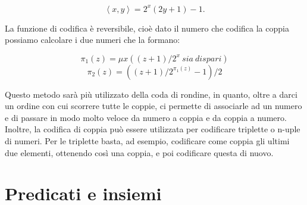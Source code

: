\begin{equation}\left\langle x,y \right\rangle = 2^x(2y+1)-1.\end{equation}

La funzione di codifica \`e reversibile, cio\`e dato il numero che codifica la coppia possiamo calcolare i due numeri che la formano:

\begin{equation}\pi_{1}(z) = \mu x((z+1)/2^x\ sia \ dispari)\end{equation}
\begin{equation}\pi_{2}(z) = ((z+1)/2^{\pi_{1}(z)} -1)/2 \end{equation} 

Questo metodo sar\`a pi\`u utilizzato della coda di rondine, in quanto, oltre a darci un ordine con cui scorrere tutte le coppie, ci permette di associarle ad un numero e di passare in modo molto veloce da numero a coppia e da coppia a numero. Inoltre, la codifica di coppia pu\`o essere utilizzata per codificare triplette o n-uple di numeri. Per le triplette basta, ad esempio, codificare come coppia gli ultimi due elementi, ottenendo cos\`i una coppia, e poi codificare questa di nuovo.


\section{Predicati e insiemi}

%
%

